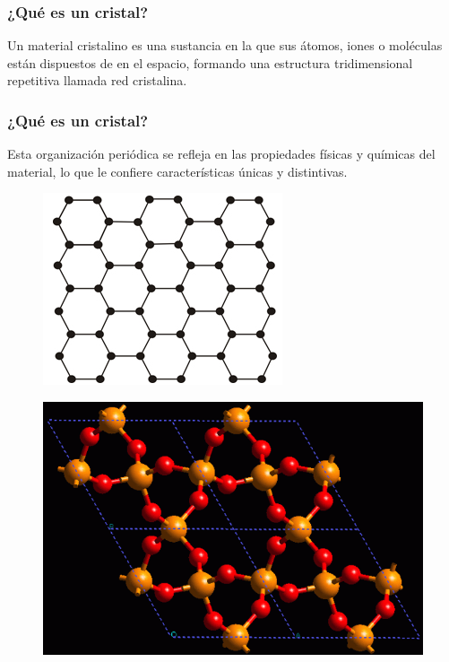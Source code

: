 \documentclass[14pt]{beamer}
\begin{document}
\begin{frame}
\frametitle{¿Qué es un cristal?}
Un material cristalino es una sustancia en la que sus átomos, iones o moléculas \pause están dispuestos de  en el espacio, \pause formando una estructura tridimensional repetitiva llamada red cristalina.
\end{frame}
\begin{frame}
\frametitle{¿Qué es un cristal?}
Esta organización periódica se refleja en las propiedades físicas y químicas del material, lo que le confiere características únicas y distintivas.
\end{frame}
\begin{frame}
\begin{figure}
    \centering
    \includegraphics[scale=1]{Imagenes/Piezoelectricidad_01.png}
\end{figure}
\end{frame}
\begin{frame}
\begin{figure}
    \centering
    \includegraphics[scale=0.6]{Imagenes/Piezoelectricidad_02.png}
\end{figure}
\end{frame}
\end{document}
